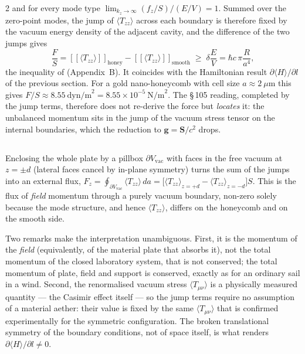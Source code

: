\documentclass[twoside, 10pt]{article}
\def\myvspacebeforesubsection{-2.0mm}
\def\myvspaceaftersubsection{-2.5mm}
\begin{document}
\begin{multicols}{2}
and for every mode type $\lim_{k_z\to\infty}(f_z/S)/(E/V)=1$. Summed over the
zero-point modes, the jump of $\langle T_{zz}\rangle$ across each boundary is
therefore fixed by the vacuum energy density of the adjacent cavity, and the
difference of the two jumps gives
\[
\frac{F}{S}=[\![\langle T_{zz}\rangle]\!]_{\mathrm{honey}}-[\![\langle T_{zz}\rangle]\!]_{\mathrm{smooth}}
\;\ge\;\delta\frac{E}{V}=\hbar c\,\pi\frac{R}{a^4},
\]
the inequality of \cite{Drozdov2024} (Appendix~B). It coincides with the
Hamiltonian result $\partial\langle H\rangle/\partial l$ of the previous section.
For a gold nano-honeycomb with cell size $a\approx 2~\mu$m this gives
$F/S\approx 8.55~\text{dyn/m}^2 = 8.55\times10^{-5}~\text{N/m}^2$.
The \S\,105 reading, completed by the jump terms, therefore does not re-derive the
force but \emph{locates} it: the unbalanced momentum sits in the jump of the vacuum
stress tensor on the internal boundaries, which the reduction to
$\mathbf{g}=\mathbf{S}/c^2$ drops.

\vspace{\myvspacebeforesubsection}
\subsection*{}
\vspace{\myvspaceaftersubsection}

Enclosing the whole plate by a pillbox $\partial V_{\mathrm{vac}}$ with faces in the
free vacuum at $z=\pm d$ (lateral faces cancel by in-plane symmetry) turns the sum of
the jumps into an external flux,
$F_z=\oint_{\partial V_{\mathrm{vac}}}\langle T_{zz}\rangle\,da
=\big[\langle T_{zz}\rangle_{z=+d}-\langle T_{zz}\rangle_{z=-d}\big]S$.
This is the flux of \emph{field} momentum through a purely vacuum boundary, non-zero
solely because the mode structure, and hence $\langle T_{zz}\rangle$, differs on the
honeycomb and on the smooth side.

Two remarks make the interpretation unambiguous.
First, it is the momentum of the \emph{field} (equivalently, of the material plate that
absorbs it), not the total momentum of the closed laboratory system, that is not
conserved; the total momentum of plate, field and support is conserved, exactly as for
an ordinary sail in a wind. Second, the renormalised vacuum stress
$\langle T_{\mu\nu}\rangle$ is a physically measured quantity --- the Casimir effect
itself --- so the jump terms require no assumption of a material aether: their value
is fixed by the same $\langle T_{\mu\nu}\rangle$ that is confirmed experimentally for
the symmetric configuration. The broken translational symmetry of the boundary
conditions, not of space itself, is what renders $\partial\langle H\rangle/\partial l\neq 0$.



\end{multicols}
\end{document}
